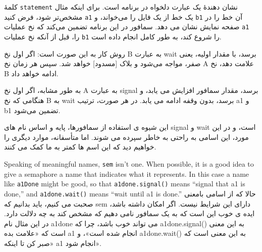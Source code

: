 \documentclass{book}
\begin{document}
کلمهٔ \texttt{statement} نشان دهندهٔ یک عبارت دلخواه در برنامه است. برای اینکه مثال مشخص‌تر شود، فرض کنید \texttt{a1}
یک خط از یک فایل را می‌خواند، و \texttt{b1} آن خط را در صفحه نمایش نشان می دهد. سمافور در این برنامه تضمین می‌کند که 
نخ  عملیات \texttt{a1} را، قبل از آنکه نخ  عملیات \texttt{b1} را شروع کند، به طور کامل انجام داده است.

روش کار به این صورت است: اگر اول نخ B به عبارت wait برسد، با مقدار اولیه، یعنی صفر، مواجه می‌شود و بلاک [مسدود] خواهد شد. سپس هر زمان نخ A علامت دهد، نخ B ادامه خواهد داد.

به طور مشابه، اگر اول نخ A به عبارت signal برسد، مقدار سمافور افزایش می یابد، و هنگامی که نخ B به wait برسد، بدون وقفه ادامه می یابد. 
در هر صورت، ترتیب a1 و b1 تضمین می‌شود.

این شیوه ی استفاده از سمافورها، پایه و اساس نام های signal و wait است، و در این مورد، این اسامی به راحتی به خاطر سپرده می شوند. اما متأسفانه، موارد دیگری را خواهیم دید که این اسم ها کمتر به ما کمک می کنند.

Speaking of meaningful names, {\tt sem} isn't one.  When
possible, it is a good idea to give a semaphore a name
that indicates what it represents.  In this case a name like
{\tt a1Done} might be good, so that {\tt a1done.signal()} means
``signal that a1 is done,'' and {\tt a1done.wait()} means
``wait until a1 is done.''
حالا که از اسامی بامعنی صحبت می کنیم، باید بدانیم که sem دارای این شرایط نیست. اگر امکان داشته باشد، ایده ی خوب این است که به یک سمافور نامی دهیم که مشخص کند به چه دلالت دارد. در این مثال نام a1done می تواند خوب باشد، چرا که a1done.signal() به این معنی است که «علامت بده a1 انجام شده است»، و a1done.wait() به این معنی است که «صبر کن تا اینکه a1 انجام شود».
\end{document}

